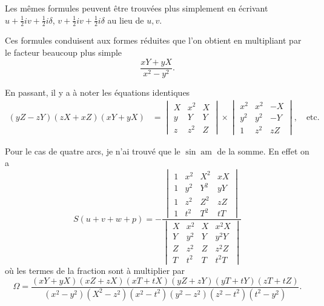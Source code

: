 \documentclass[12pt,a4paper]{article}
\theoremstyle{definition}
\begin{document}
Les m\^{e}mes formules peuvent \^{e}tre trouv\'{e}es plus simplement en \'{e}crivant $u + \frac{1}{2}iv + \frac{1}{2}i\delta$, $v + \frac{1}{2}iv + \frac{1}{2}i\delta$ au lieu de $u, v$.

Ces formules conduisent aux formes r\'{e}duites que l'on obtient en multipliant par le facteur beaucoup plus simple
\[
\frac{xY + yX}{x^2 - y^2}.
\]

En passant, il y a \`{a} noter les \'{e}quations identiques
\begin{align*}
(yZ - zY)(zX + xZ)(xY + yX) &=
\begin{vmatrix}
X & x^2 & X \\
y & Y & Y \\
z & z^2 & Z
\end{vmatrix} \times
\begin{vmatrix}
x^2 & x^2 & -X \\
y^2 & y^2 & -Y \\
1 & z^2 & zZ
\end{vmatrix}, \quad \text{etc.}
\end{align*}

Pour le cas de quatre arcs, je n'ai trouv\'{e} que le $\sin \operatorname{am}$ de la somme. En effet on a
\[
S(u + v + w + p) = -\frac{
\begin{vmatrix}
1 & x^2 & X^2 & xX \\
1 & y^2 & Y^2 & yY \\
1 & z^2 & Z^2 & zZ \\
1 & t^2 & T^2 & tT
\end{vmatrix}}{
\begin{vmatrix}
X & x^2 & X & x^2X \\
Y & y^2 & Y & y^2Y \\
Z & z^2 & Z & z^2Z \\
T & t^2 & T & t^2T
\end{vmatrix}}
\]
o\`{u} les termes de la fraction sont \`{a} multiplier par
\[
\Omega = \frac{(xY + yX)(xZ + zX)(xT + tX)(yZ + zY)(yT + tY)(zT + tZ)}{(x^2 - y^2)(X^2 - z^2)(x^2 - t^2)(y^2 - z^2)(z^2 - t^2)(t^2 - y^2)}.
\]
\end{document}
